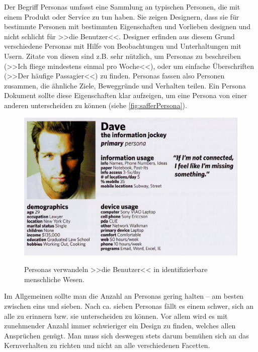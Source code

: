 Der Begriff Personas umfasst eine Sammlung an typischen Personen, die mit einem Produkt oder Service zu tun haben. Sie zeigen Designern, dass sie für bestimmte Personen mit bestimmten Eigenschaften und Vorlieben designen und nicht schlicht für >>die Benutzer<<. 
Designer erfinden aus diesem Grund verschiedene Personas mit Hilfe von Beobachtungen und Unterhaltungen mit Usern. Zitate von diesen sind z.B. sehr nützlich, um Personas zu beschreiben (>>Ich fliege mindestens einmal pro Woche<<), oder um einfache Überschriften (>>Der häufige Passagier<<) zu finden. Personas fassen also Personen zusammen, die ähnliche Ziele, Beweggründe und Verhalten teilen. Ein Persona Dokument sollte diese Eigenschaften klar aufzeigen, um eine Persona von einer anderen unterscheiden zu können (siehe \autoref{fig:safferPersona}).

\begin{figure}
	\begin{center}
        {\includegraphics[width=\linewidth]{gfx/safferPersona}}
	\end{center}
		\caption[Persona \newline \citep{Saffer:2007}]{Personas verwandeln >>die Benutzer<< in identifizierbare menschliche Wesen.}\label{fig:safferPersona}
\end{figure}

\medskip Im Allgemeinen sollte man die Anzahl an Personas gering halten – am besten zwischen eins und sieben. Nach ca. sieben Personas fällt es einem schwer, sich an alle zu erinnern bzw. sie unterscheiden zu können. Vor allem wird es mit zunehmender Anzahl immer schwieriger ein Design zu finden, welches allen Ansprüchen genügt. Man muss sich deswegen stets darum bemühen sich an das Kernverhalten zu richten und nicht an alle verschiedenen Facetten.

